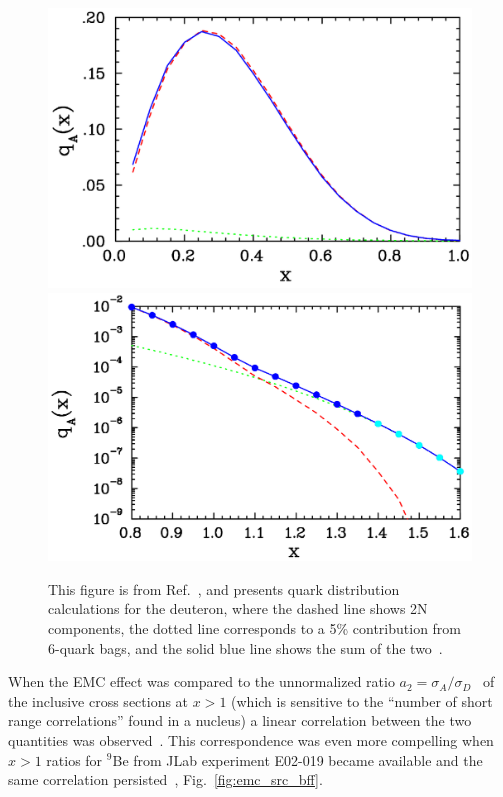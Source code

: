 \begin{figure}[tbp]
\includegraphics[width=1.0\columnwidth]{plots/qofxect_5per_lin_crop} \hfill
\includegraphics[width=1.0\columnwidth]{plots/qofxect_5per_log_crop}
\caption{This figure is from Ref.~\cite{Arrington:2003qt}, and presents quark distribution calculations for the deuteron, where the dashed line shows 2N components, the dotted line corresponds to a 5\% contribution from 6-quark bags, and the solid blue line shows the sum of the two~\cite{Mulders:1983au}. }
\label{fig:quarkbags}
\end{figure}

When the EMC effect was compared to the unnormalized ratio $a_2=\sigma_A/\sigma_D$~\cite{Frankfurt:1993sp} of the
inclusive cross sections at $x>1$ (which is sensitive to the ``number of short range correlations''
found in a nucleus) a linear correlation between the two quantities was observed~\cite{Weinstein:2010rt}.
This correspondence was even more compelling when $x>1$ ratios for $^9$Be from JLab experiment E02-019 became
available and the same correlation persisted~\cite{Arrington:2012ax, Hen:2012fm}, Fig.~\ref{fig:emc_src_bff}.

